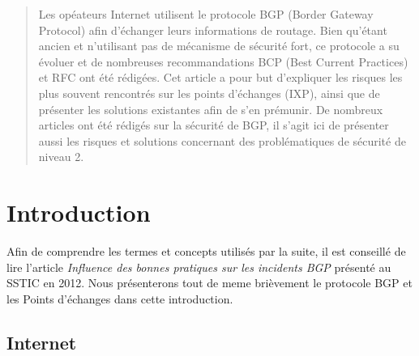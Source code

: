 



\maketitle
{}


\begin{abstract}
 Les opéateurs Internet utilisent le protocole BGP (Border Gateway Protocol) afin d'échanger leurs informations de routage. Bien qu'étant ancien et n'utilisant pas de mécanisme de sécurité fort, ce protocole a su évoluer et de nombreuses recommandations BCP (Best Current Practices) et RFC ont été rédigées.
 Cet article a pour but d'expliquer les risques les plus souvent rencontrés sur les points d'échanges (IXP), ainsi que de présenter les solutions existantes afin de s'en prémunir. 
 De nombreux articles ont été rédigés sur la sécurité de BGP, il s'agit ici de présenter aussi les risques et solutions concernant des problématiques de sécurité de niveau 2.
\end{abstract}


\section{Introduction}

Afin de comprendre les termes et concepts utilisés par la suite, il est conseillé de lire l'article \emph{Influence des bonnes pratiques sur les incidents BGP} \cite{fenioux:SSTIC2012} présenté au SSTIC en 2012. Nous présenterons tout de meme brièvement le protocole BGP et les Points d'échanges dans cette introduction.

\subsection{Internet}

